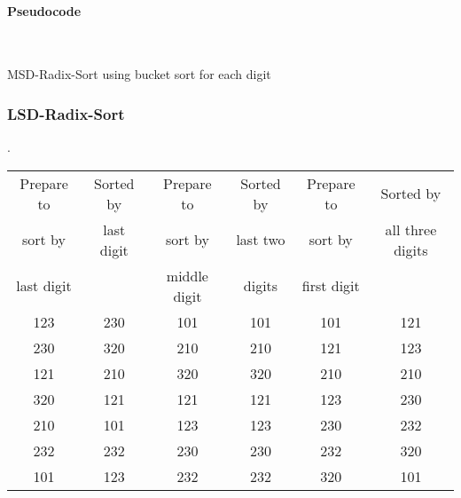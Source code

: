 \documentclass{article}
\begin{document}
\paragraph{Pseudocode} \phantom{text} \\ 
\begin{algorithm}[H]
    \DontPrintSemicolon  %
    \SetAlgoLined        %
    
    \BlankLine
    \caption{MSD-Radix-Sort using bucket sort for each digit}
\end{algorithm}

\subsubsection{LSD-Radix-Sort}

\begin{examplee}[].
    \begin{center}
        \begin{tabular}{|c|c|c|c|c|c|}
            \hline
            Prepare to & Sorted by & Prepare to & Sorted by & Prepare to & Sorted by \\ 
            sort by & last digit & sort by & last two & sort by & all three digits \\
            last digit & & middle digit & digits & first digit & \\ \hline
            123 & 230 & 101 & 101 & 101 & 121 \\
            230 & 320 & 210 & 210 & 121 & 123 \\
            121 & 210 & 320 & 320 & 210 & 210 \\
            320 & 121 & 121 & 121 & 123 & 230 \\
            210 & 101 & 123 & 123 & 230 & 232 \\
            232 & 232 & 230 & 230 & 232 & 320 \\
            101 & 123 & 232 & 232 & 320 & 101 \\ \hline
            \end{tabular}
    \end{center}
\end{examplee}
\end{document}
